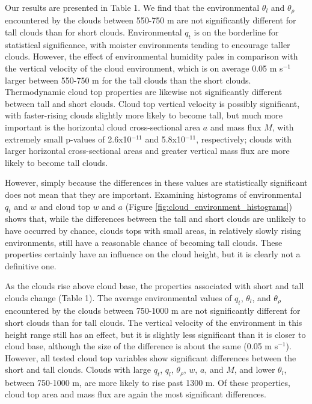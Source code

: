 \documentclass[acp]{copernicus}
\begin{document}
Our results are presented in Table 1.  We find that the environmental 
$\theta_l$ and $\theta_\rho$ encountered by the clouds between 550-750 m are 
not significantly different for tall clouds than for short clouds.  
Environmental $q_t$ is on the borderline for statistical significance, with 
moister environments tending to encourage taller clouds.  However, the effect 
of environmental humidity pales in comparison with the vertical velocity of the 
cloud environment, which is on average 0.05 m s$^{-1}$ larger between 550-750 m 
for the tall clouds than the short clouds.  Thermodynamic cloud top properties 
are likewise not significantly different between tall and short clouds.  Cloud 
top vertical velocity is possibly significant, with faster-rising clouds 
slightly more likely to become tall, but much more important is the horizontal 
cloud cross-sectional area $a$ and mass flux $M$, with extremely small p-values 
of 2.6x10$^{-11}$ and 5.8x10$^{-11}$, respectively; clouds with larger 
horizontal cross-sectional areas and greater vertical mass flux are more likely 
to become tall clouds.

However, simply because the differences in these values are statistically 
significant does not mean that they are important.  Examining histograms of 
environmental $q_t$ and $w$ and cloud top $w$ and $a$ (Figure 
\ref{fig:cloud_environment_histograms}) shows that, while the differences 
between the tall and short clouds are unlikely to have occurred by chance, 
clouds tops with small areas, in relatively slowly rising environments, still 
have a reasonable chance of becoming tall clouds.  These properties certainly 
have an influence on the cloud height, but it is clearly not a definitive one.

As the clouds rise above cloud base, the properties associated with short and 
tall clouds change (Table 1).  The average environmental 
values of $q_t$, $\theta_l$, and $\theta_\rho$ encountered by the clouds 
between 750-1000 m are not significantly different for short clouds than for 
tall clouds.  The vertical velocity of the environment in this height range 
still has an effect, but it is slightly less significant than it is closer to 
cloud base, although the size of the difference is about the same 
(0.05 m s$^{-1}$).  However, all tested cloud top variables show significant 
differences between the short and tall clouds.  Clouds with large $q_t$, $q_l$, 
$\theta_\rho$, $w$, $a$, and $M$, and lower $\theta_l$, between 750-1000 m, 
are more likely to rise past 1300 m.  Of these properties, cloud top area and 
mass flux are again the most significant differences.
\end{document}
